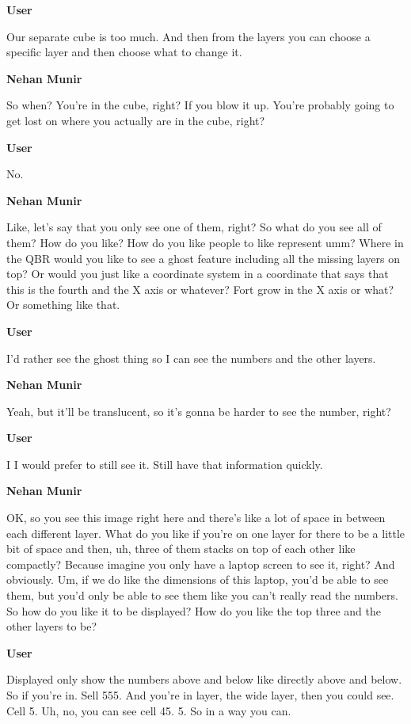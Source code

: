 \documentclass{article}
\begin{document}
\noindent \textbf{User}

Our separate cube is too much. And then from the layers you can choose a specific layer and then choose what to change it.

\noindent \textbf{Nehan Munir}

So when? You're in the cube, right? If you blow it up. You're probably going to get lost on where you actually are in the cube, right?

\noindent \textbf{User}

No.

\noindent \textbf{Nehan Munir}

Like, let's say that you only see one of them, right? So what do you see all of them? How do you like? How do you like people to like represent umm? Where in the QBR would you like to see a ghost feature including all the missing layers on top? Or would you just like a coordinate system in a coordinate that says that this is the fourth and the X axis or whatever? Fort grow in the X axis or what? Or something like that.

\noindent \textbf{User}

I'd rather see the ghost thing so I can see the numbers and the other layers.

\noindent \textbf{Nehan Munir}

Yeah, but it'll be translucent, so it's gonna be harder to see the number, right?

\noindent \textbf{User}

I I would prefer to still see it. Still have that information quickly.

\noindent \textbf{Nehan Munir}

OK, so you see this image right here and there's like a lot of space in between each different layer. What do you like if you're on one layer for there to be a little bit of space and then, uh, three of them stacks on top of each other like compactly? Because imagine you only have a laptop screen to see it, right? And obviously. Um, if we do like the dimensions of this laptop, you'd be able to see them, but you'd only be able to see them like you can't really read the numbers. So how do you like it to be displayed? How do you like the top three and the other layers to be?

\noindent \textbf{User}

Displayed only show the numbers above and below like directly above and below. So if you're in. Sell 555. And you're in layer, the wide layer, then you could see. Cell 5. Uh, no, you can see cell 45. 5. So in a way you can.
\end{document}
